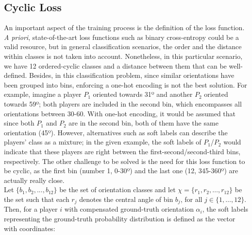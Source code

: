 \documentclass{article}
\newcommand{\cb}[2]{{\sout{#1}}{\color{cyan}#2}}
\begin{document}
\subsection{Cyclic Loss}
An important aspect of the training process is the definition of the loss function. %
\textit{A priori}, state-of-the-art loss functions such as binary cross-entropy could be a valid resource, but in general classification scenarios, the order and the distance within classes is not taken into account. Nonetheless, in this particular scenario, we have 12 ordered-cyclic classes and a distance between them that can be well-defined. Besides, in this classification problem, since similar orientations have been grouped into bins, enforcing a one-hot encoding is not the best solution. For example, imagine a player $P_{1}$ oriented towards 31º and another $P_{2}$ oriented towards 59º; both players are included in the second bin, which encompasses all orientations between 30-60. With one-hot encoding, it would be assumed that since both $P_{1}$ and $P_{2}$ are in the second bin, both of them have the same orientation (45º). However, alternatives such as soft labels \cite{diaz2019soft} can describe the players' class as a mixture; in the given example, the soft labels of $P_{1}$/$P_{2}$ would indicate that these players are right between the first-second/second-third bins, respectively. The other challenge to be solved is the need for this loss function to be cyclic, as the first bin (number 1, 0-30º) and the last one (12, 345-360º) are actually really close. \\
Let $\{b_{1}, b_{2}, ... , b_{12}\}$ be the set of orientation classes and let $\chi = \{r_{1}, r_{2},\dots, r_{12}\}$ be the set such that each $r_j$ denotes the central angle of bin $b_{j}$, for all $j\in\{ 1,\dots,12\}$. Then, for a player $i$ with compensated ground-truth orientation $\alpha_{i}$, the soft labels representing the ground-truth probability distribution is defined as the vector with coordinates:
\end{document}
